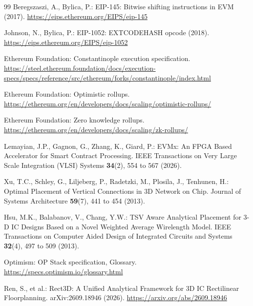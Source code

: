 \documentclass[runningheads]{llncs}
\begin{document}
\begin{thebibliography}{99}
 Beregszaszi, A., Bylica, P.: EIP-145: Bitwise shifting instructions in EVM (2017). \url{https://eips.ethereum.org/EIPS/eip-145}

 Johnson, N., Bylica, P.: EIP-1052: EXTCODEHASH opcode (2018). \url{https://eips.ethereum.org/EIPS/eip-1052}

 Ethereum Foundation: Constantinople execution specification. \url{https://steel.ethereum.foundation/docs/execution-specs/specs/reference/src/ethereum/forks/constantinople/index.html}

 Ethereum Foundation: Optimistic rollups. \url{https://ethereum.org/en/developers/docs/scaling/optimistic-rollups/}

 Ethereum Foundation: Zero knowledge rollups. \url{https://ethereum.org/en/developers/docs/scaling/zk-rollups/}

 Lemayian, J.P., Gagnon, G., Zhang, K., Giard, P.: EVMx: An FPGA Based Accelerator for Smart Contract Processing. IEEE Transactions on Very Large Scale Integration (VLSI) Systems \textbf{34}(2), 554 to 567 (2026). 

 Xu, T.C., Schley, G., Liljeberg, P., Radetzki, M., Plosila, J., Tenhunen, H.: Optimal Placement of Vertical Connections in 3D Network on Chip. Journal of Systems Architecture \textbf{59}(7), 441 to 454 (2013). 

 Hsu, M.K., Balabanov, V., Chang, Y.W.: TSV Aware Analytical Placement for 3-D IC Designs Based on a Novel Weighted Average Wirelength Model. IEEE Transactions on Computer Aided Design of Integrated Circuits and Systems \textbf{32}(4), 497 to 509 (2013). 

 Optimism: OP Stack specification, Glossary. \url{https://specs.optimism.io/glossary.html}

 Ren, S., et al.: Rect3D: A Unified Analytical Framework for 3D IC Rectilinear Floorplanning. arXiv:2609.18946 (2026). \url{https://arxiv.org/abs/2609.18946}
\end{thebibliography}
\end{document}
